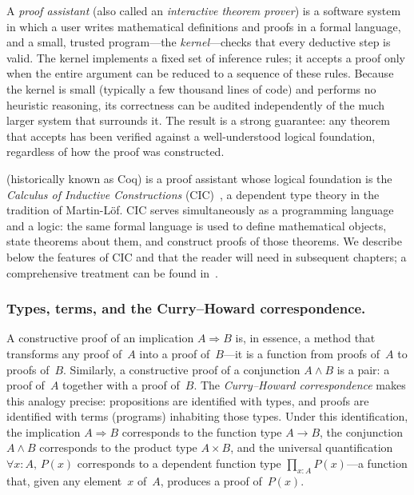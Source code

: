 A \emph{proof assistant} (also called an \emph{interactive theorem
prover}) is a software system in which a user writes mathematical
definitions and proofs in a formal language, and a small, trusted
program---the \emph{kernel}---checks that every deductive step is valid.
The kernel implements a fixed set of inference rules; it accepts a proof
only when the entire argument can be reduced to a sequence of these
rules.  Because the kernel is small (typically a few thousand lines of
code) and performs no heuristic reasoning, its correctness can be
audited independently of the much larger system that surrounds it.  The
result is a strong guarantee: any theorem that \Rocq{} accepts has been
verified against a well-understood logical foundation, regardless of how
the proof was constructed.

\Rocq{} (historically known as Coq) is a proof assistant whose logical
foundation is the \emph{Calculus of Inductive Constructions}
(CIC)~\cite{BertotCasteran2004}, a dependent type theory in the
tradition of Martin-L\"{o}f.  CIC serves simultaneously as a programming
language and a logic: the same formal language is used to define
mathematical objects, state theorems about them, and construct proofs of
those theorems.  We describe below the features of CIC and \Rocq{} that
the reader will need in subsequent chapters; a comprehensive treatment
can be found in~\cite{BertotCasteran2004}.

\subsubsection*{Types, terms, and the Curry--Howard correspondence.}

A constructive proof of an implication $A \Rightarrow B$ is, in
essence, a method that transforms any proof of~$A$ into a proof
of~$B$---it is a function from proofs of~$A$ to proofs of~$B$.
Similarly, a constructive proof of a conjunction $A \land B$ is a pair:
a proof of~$A$ together with a proof of~$B$.  The
\emph{Curry--Howard correspondence} makes this analogy precise:
propositions are identified with types, and proofs are identified with
terms (programs) inhabiting those types.  Under this identification, the
implication $A \Rightarrow B$ corresponds to the function type $A \to B$,
the conjunction $A \land B$ corresponds to the product type $A \times B$,
and the universal quantification $\forall x : A,\, P(x)$ corresponds to
a dependent function type $\prod_{x : A} P(x)$---a function that, given
any element~$x$ of~$A$, produces a proof of~$P(x)$.

